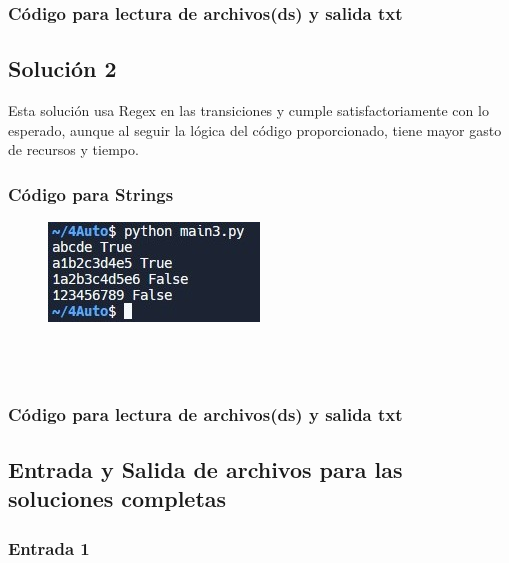 \documentclass[https://www.overleaf.com/project/63761df255a8a9f4a15c3579
	letterpaper, %
	10pt, %
]{CSUniSchoolLabReport}
\begin{document}
\subsubsection*{Código para lectura de archivos(ds) y salida txt }



\subsection*{Solución 2}
Esta solución usa Regex en las transiciones y cumple satisfactoriamente con lo esperado, aunque al seguir la lógica del código proporcionado, tiene mayor gasto de recursos y tiempo.

\subsubsection*{Código para Strings}


\begin{figure}[H]
	\centering
	\includegraphics[width=0.5\textwidth]{images/2.jpg}
\end{figure}
\\\\
\subsubsection*{Código para lectura de archivos(ds) y salida txt }


\subsection*{Entrada y Salida de archivos para las soluciones completas}
\subsubsection*{Entrada 1}

\end{document}
